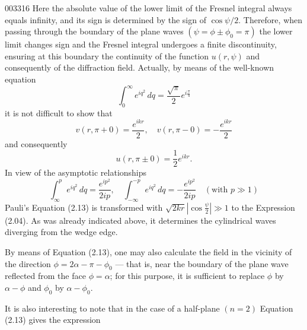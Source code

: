 \begin{scanpage}{0033}{16}
Here the absolute value of the lower limit of the Fresnel integral always equals infinity, and its sign is determined by the sign of $\cos\psi/2$. Therefore, when passing through the boundary of the plane waves $(\psi=\phi\pm\phi_0=\pi)$ the lower limit changes sign and the Fresnel integral undergoes a finite discontinuity, ensuring at this boundary the continuity of the function $u(r,\psi)$ and consequently of the diffraction field. Actually, by means of the well-known equation
\[\int_0^\infty e^{iq^2}\,dq=\frac{\sqrt\pi}{2}e^{i\frac\pi4}\tag{2.14}\]
it is not difficult to show that
\[v(r,\pi+0)=\frac{e^{ikr}}2,\quad v(r,\pi-0)=-\frac{e^{ikr}}2\tag{2.15}\]
and consequently
\[u(r,\pi\pm0)=\frac12e^{ikr}.\tag{2.16}\]
In view of the asymptotic relationships
\[\int_\infty^p e^{iq^2}\,dq=\frac{e^{ip^2}}{2ip},\quad\int_{-\infty}^{-p}e^{iq^2}\,dq=-\frac{e^{ip^2}}{2ip}\quad(\text{with }p\gg1)\tag{2.17}\]
Pauli's Equation (2.13) is transformed with $\sqrt{2kr}\left|\cos\frac\psi2\right|\gg1$ to the Expression (2.04). As was already indicated above, it determines the cylindrical waves diverging from the wedge edge.

By means of Equation (2.13), one may also calculate the field in the vicinity of the direction $\phi=2\alpha-\pi-\phi_0$ --- that is, near the boundary of the plane wave reflected from the face $\phi=\alpha$; for this purpose, it is sufficient to replace $\phi$ by $\alpha-\phi$ and $\phi_0$ by $\alpha-\phi_0$.

It is also interesting to note that in the case of a half-plane $(n=2)$ Equation (2.13) gives the expression
\end{scanpage}
